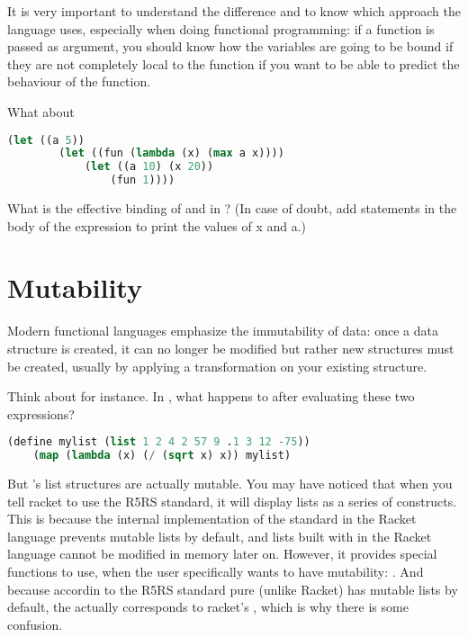 \documentclass{../../../tp}
\begin{document}
It is very important to understand the difference and to know which approach the language uses, especially when doing functional programming: if a function is passed as argument, you should know how the variables are going to be bound if they are not completely local to the function if you want to be able to predict the behaviour of the function.

\begin{instruction}
	
	What about 
	
	\begin{lstlisting}[language=lisp]
	(let ((a 5)) 
		(let ((fun (lambda (x) (max a x))))
			(let ((a 10) (x 20))
				(fun 1))))
	\end{lstlisting}
	
	What is the effective binding of  and  in ?
	(In case of doubt, add  statements in the body of the 
	expression to print the values of x and a.)
	
\end{instruction}


\section{Mutability}

Modern functional languages emphasize the immutability of data: once a data structure is created, it can no longer be modified but rather new structures must be created, usually by applying a transformation on your existing structure.

\begin{instruction} 
	Think about  for instance. In \scheme, what happens to  after evaluating these two expressions?
	
	\begin{lstlisting}[language=lisp]
	(define mylist (list 1 2 4 2 57 9 .1 3 12 -75))
	(map (lambda (x) (/ (sqrt x) x)) mylist)
	\end{lstlisting}

\end{instruction}

But \scheme's list structures are actually mutable. You may have noticed that when you tell racket to use the R5RS standard, it will display lists as a series of  constructs. This is because the internal implementation of the \scheme standard in the Racket language prevents mutable lists by default, and lists built with  in the Racket language cannot be modified in memory later on. However, it provides special functions to use, when the user specifically wants to have mutability: . And because accordin to the R5RS standard pure \scheme (unlike Racket) has mutable lists by default, the \scheme {} actually corresponds to racket's , which is why there is some confusion.
\end{document}
